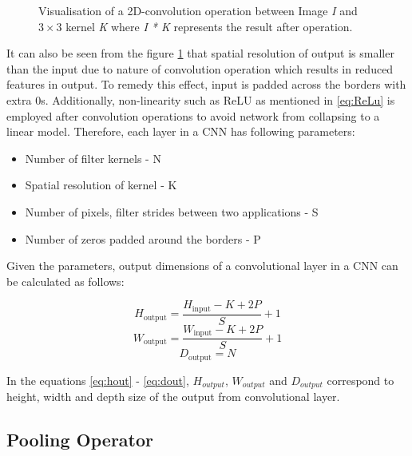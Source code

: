 \begin{figure}[!ht]
\begin{tikzpicture}
        \end{tikzpicture}

	\caption[Visualisation of 2D Convolution Operation]{Visualisation of a 2D-convolution operation between Image \textit{I} and $3\times3$ kernel \textit{K} where \textit{I * K} represents the result after operation. \cite{MATCONV} }
	\label{fig:Conv} 
\end{figure}

It can also be seen from the figure \ref{fig:Conv} that spatial resolution of output is smaller than the input due to nature of convolution operation which results in reduced features in output. To remedy this effect, input is padded across the borders with extra 0s. Additionally, non-linearity such as ReLU as mentioned in \ref{eq:ReLu} is employed after convolution operations to avoid network from collapsing to a linear model. Therefore, each layer in a CNN has following parameters:

\begin{itemize}
    \item Number of filter kernels - N
    \item Spatial resolution of kernel - K
    \item Number of pixels, filter strides between two applications - S
    \item Number of zeros padded around the borders - P
\end{itemize}

Given the parameters, output dimensions of a convolutional layer in a CNN can be calculated as follows:

\begin{equation} H_{\text {output}}=\frac{H_{\text {input}}-K+2 P}{S}+1\label{eq:hout}\end{equation}
\begin{equation} W_{\text {output}}=\frac{W_{\text {input}}-K+2 P}{S}+1\label{eq:wout}\end{equation}
\begin{equation}D_{\text {output}}=N\label{eq:dout}\end{equation}

In the equations \ref{eq:hout} - \ref{eq:dout}, $H_{output}$, $W_{output}$ and $D_{output}$ correspond to height, width and depth size of the output from convolutional layer.


\subsection{Pooling Operator}

